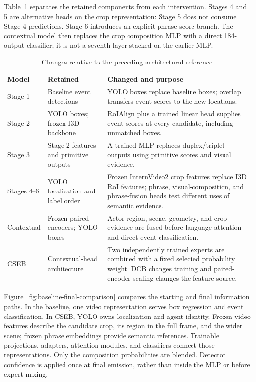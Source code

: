 Table~\ref{tab:modification-map} separates the retained components from each intervention. Stages 4 and 5 are alternative heads on the crop representation: Stage 5 does not consume Stage 4 predictions. Stage 6 introduces an explicit phrase-score branch. The contextual model then replaces the crop composition MLP with a direct 184-output classifier; it is not a seventh layer stacked on the earlier MLP.

\begin{table}[htbp]
\centering
\caption{Changes relative to the preceding architectural reference.}
\label{tab:modification-map}
\begin{singlespace}
\begin{tabularx}{\textwidth}{@{}p{}XX@{}}
\toprule
\textbf{Model} & \textbf{Retained} & \textbf{Changed and purpose}\\
\midrule
Stage 1 & Baseline event detections & YOLO boxes replace baseline boxes; overlap transfers event scores to the new locations.\\[5pt]
Stage 2 & YOLO boxes; frozen I3D backbone & RoIAlign plus a trained linear head supplies event scores at every candidate, including unmatched boxes.\\[5pt]
Stage 3 & Stage 2 features and primitive outputs & A trained MLP replaces duplex/triplet outputs using primitive scores and visual evidence.\\[5pt]
Stages 4--6 & YOLO localization and label order & Frozen InternVideo2 crop features replace I3D RoI features; phrase, visual-composition, and phrase-fusion heads test different uses of semantic evidence.\\[5pt]
Contextual & Frozen paired encoders; YOLO boxes & Actor-region, scene, geometry, and crop evidence are fused before language attention and direct event classification.\\[5pt]
CSEB & Contextual-head architecture & Two independently trained experts are combined with a fixed selected probability weight; DCB changes training and paired-encoder scaling changes the feature source.\\
\bottomrule
\end{tabularx}
\end{singlespace}
\end{table}

Figure~\ref{fig:baseline-final-comparison} compares the starting and final information paths. In the baseline, one video representation serves box regression and event classification. In CSEB, YOLO owns localization and agent identity. Frozen video features describe the candidate crop, its region in the full frame, and the wider scene; frozen phrase embeddings provide semantic references. Trainable projections, adapters, attention modules, and classifiers connect those representations. Only the composition probabilities are blended. Detector confidence is applied once at final emission, rather than inside the MLP or before expert mixing.

